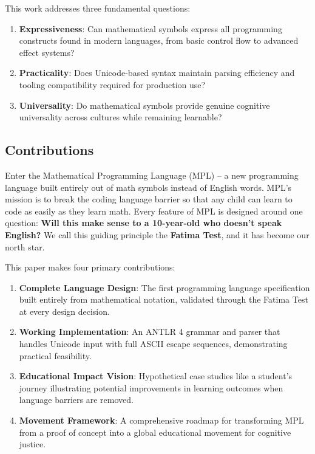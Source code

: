 \documentclass[10pt,conference]{IEEEtran}
\begin{document}
This work addresses three fundamental questions:

\begin{enumerate}
\item \textbf{Expressiveness}: Can mathematical symbols express all programming constructs found in modern languages, from basic control flow to advanced effect systems?
\item \textbf{Practicality}: Does Unicode-based syntax maintain parsing efficiency and tooling compatibility required for production use?
\item \textbf{Universality}: Do mathematical symbols provide genuine cognitive universality across cultures while remaining learnable?
\end{enumerate}

\subsection{Contributions}

Enter the Mathematical Programming Language (MPL) – a new programming language built entirely out of math symbols instead of English words. MPL's mission is to break the coding language barrier so that any child can learn to code as easily as they learn math. Every feature of MPL is designed around one question: \textbf{Will this make sense to a 10-year-old who doesn't speak English?} We call this guiding principle the \textbf{Fatima Test}, and it has become our north star.

This paper makes four primary contributions:

\begin{enumerate}
\item \textbf{Complete Language Design}: The first programming language specification built entirely from mathematical notation, validated through the Fatima Test at every design decision.
\item \textbf{Working Implementation}: An ANTLR 4 grammar and parser that handles Unicode input with full ASCII escape sequences, demonstrating practical feasibility.
\item \textbf{Educational Impact Vision}: Hypothetical case studies like a student's journey illustrating potential improvements in learning outcomes when language barriers are removed.
\item \textbf{Movement Framework}: A comprehensive roadmap for transforming MPL from a proof of concept into a global educational movement for cognitive justice.
\end{enumerate}
\end{document}
